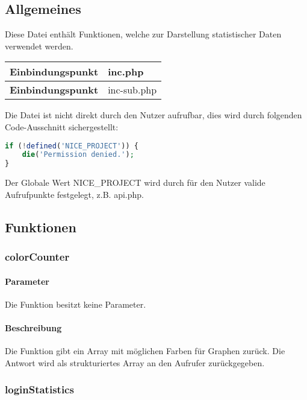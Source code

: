 \subsection{Allgemeines} Diese Datei enthält Funktionen, welche zur Darstellung statistischer Daten verwendet werden.
\begin{table}[H]
	\begin{tabular}{|c|p{11cm}|}
		\hline
		\textbf{Einbindungspunkt} & inc.php \\ \hline
		\textbf{Einbindungspunkt} & inc-sub.php \\ \hline
	\end{tabular}
\end{table}
Die Datei ist nicht direkt durch den Nutzer aufrufbar, dies wird durch folgenden Code-Ausschnitt sichergestellt:
\begin{lstlisting}[language=php]
if (!defined('NICE_PROJECT')) {
	die('Permission denied.');
}
\end{lstlisting}
Der Globale Wert {\glqq NICE\_PROJECT\grqq} wird durch für den Nutzer valide Aufrufpunkte festgelegt, z.B. {\glqq api.php\grqq}.
\newpage
\subsection{Funktionen}
\subsubsection{colorCounter}
\paragraph{Parameter} Die Funktion besitzt keine Parameter.
\paragraph{Beschreibung} Die Funktion gibt ein Array mit möglichen Farben für Graphen zurück. Die Antwort wird als strukturiertes Array an den Aufrufer zurückgegeben.
\subsubsection{loginStatistics}
